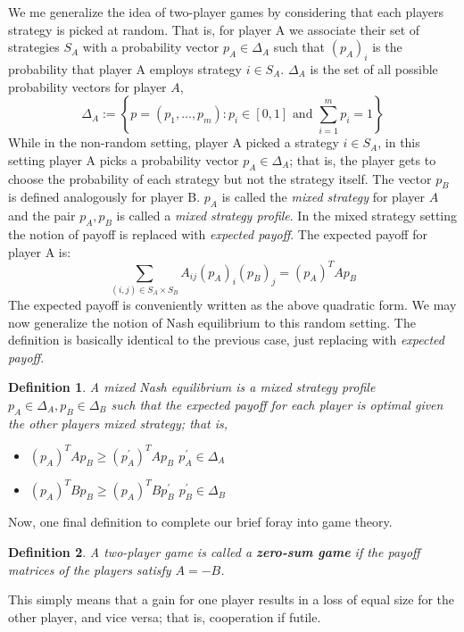\documentclass[12pt]{article}
\newtheorem{definition}{Definition}
\begin{document}
We me generalize the idea of two-player games by considering that each players strategy is picked at random. That is, for player A we associate their 
set of strategies $S_A$ with a probability vector $p_A \in \Delta_A$ such that $(p_A)_i$ is the probability that player A employs strategy $i \in S_A$. 
$\Delta_A$ is the set of all possible probability vectors for player $A$,
\[ \Delta_A := \left\{p = (p_1, \dots, p_m) : p_i \in [0, 1] \text{ and } \sum_{i = 1}^{m} p_i = 1\right\} \]
While in the non-random setting, player A picked a strategy $i \in S_A$, in this setting player A picks a probability vector $p_A \in \Delta_A$; that is, the player 
gets to choose the probability of each strategy but not the strategy itself. 
The vector $p_B$ is defined analogously for player B. 
$p_A$ is called the \textit{mixed strategy} for player $A$ and the pair $p_A, p_B$ is called a \textit{mixed strategy profile}. 
In the mixed strategy setting the notion of payoff is replaced with \textit{expected payoff}. The expected payoff for 
player A is: 
\[\sum_{(i, j) \in S_A \times S_B} A_{ij} (p_A)_i (p_B)_j = (p_A)^T A p_B\]
The expected payoff is conveniently written as the above quadratic form. We may now generalize the notion of Nash equilibrium to this random setting. The 
definition is basically identical to the previous case, just replacing  with \textit{expected payoff}. 
\begin{definition}
A mixed Nash equilibrium is a mixed strategy profile $p_A \in \Delta_A, p_B \in \Delta_B$ such that the expected payoff for each player is optimal given the other 
players mixed strategy; that is, 
\begin{itemize}
\item $(p_A)^T A p_B \geq (p^\prime_A)^T A p_B$  $p^\prime_A \in \Delta_A$
\item $(p_A)^T B p_B \geq (p_A)^T B p^\prime_B$  $p^\prime_B \in \Delta_B$
\end{itemize} 
\end{definition}

Now, one final definition to complete our brief foray into game theory. 
\begin{definition}
A two-player game is called a \textbf{zero-sum game} if the payoff matrices of the players satisfy $A = -B$. 
\end{definition}
This simply means that a gain for one player results in a loss of equal size for the other player, and vice versa; that is, cooperation if futile. 
\end{document}
